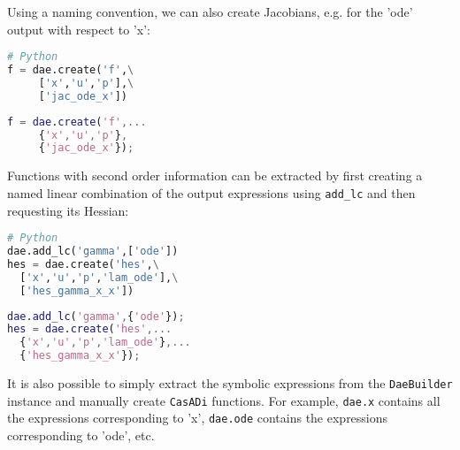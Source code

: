 \documentclass[a4paper,12pt]{book}
\newcommand{\CasADi}{\texttt{CasADi}\xspace}
\newcommand{\python}[1]{\lstinline[language=Python]{#1}}
\begin{document}
Using a naming convention, we can also create Jacobians, e.g. for the 'ode'
output with respect to 'x':

\begin{minipage}[t]{0.5\textwidth}
\begin{lstlisting}[language=Python]
# Python
f = dae.create('f',\
     ['x','u','p'],\
     ['jac_ode_x'])
\end{lstlisting}
\end{minipage}
\begin{minipage}[t]{0.5\textwidth}
\begin{lstlisting}[language=Matlab]
% MATLAB/Octave
f = dae.create('f',...
     {'x','u','p'},
     {'jac_ode_x'});
\end{lstlisting}
\end{minipage}

Functions with second order information can be extracted by first creating
a named linear combination of the output expressions using \python{add_lc}
and then requesting its Hessian:

\begin{minipage}[t]{0.5\textwidth}
\begin{lstlisting}[language=Python]
# Python
dae.add_lc('gamma',['ode'])
hes = dae.create('hes',\
  ['x','u','p','lam_ode'],\
  ['hes_gamma_x_x'])
\end{lstlisting}
\end{minipage}
\begin{minipage}[t]{0.5\textwidth}
\begin{lstlisting}[language=Matlab]
% MATLAB/Octave
dae.add_lc('gamma',{'ode'});
hes = dae.create('hes',...
  {'x','u','p','lam_ode'},...
  {'hes_gamma_x_x'});
\end{lstlisting}
\end{minipage}

It is also possible to simply extract the symbolic expressions from the
\texttt{DaeBuilder} instance and manually create \CasADi functions.
For example, \python{dae.x} contains all the expressions corresponding to 'x',
\python{dae.ode} contains the expressions corresponding to 'ode', etc.

\end{document}
